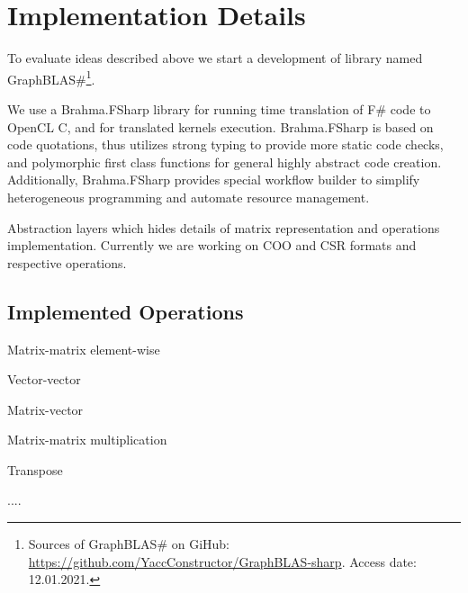 \section{Implementation Details}

To evaluate ideas described above we start a development of library named GraphBLAS\#\footnote{Sources of GraphBLAS\# on GiHub: \url{https://github.com/YaccConstructor/GraphBLAS-sharp}. Access date: 12.01.2021.}.

We use a Brahma.FSharp library for running time translation of F\# code to OpenCL C, and for translated kernels execution. 
Brahma.FSharp is based on code quotations, thus utilizes strong typing to provide more static code checks, and polymorphic first class functions for general highly abstract code creation.
Additionally, Brahma.FSharp provides special workflow builder to simplify heterogeneous programming and automate resource management.  

Abstraction layers which hides details of matrix representation and operations implementation.
Currently we are working on COO and CSR formats and respective operations.

\subsection{Implemented Operations}
Matrix-matrix element-wise

Vector-vector

Matrix-vector 

Matrix-matrix multiplication

Transpose

....
